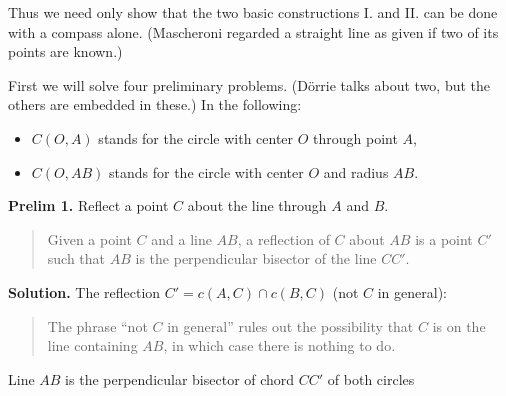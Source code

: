 \documentclass[11pt,a4paper]{article}
\begin{document}
Thus we need only show that the two basic constructions I. and II. can be done with a compass alone. (Mascheroni regarded a straight line as given if two of its points are known.)

First we will solve four preliminary problems. (Dörrie talks about two, but the others are embedded in these.) In the following:
\begin{itemize}
\item $C(O,A)$ stands for the circle with center $O$ through point $A$,
\item $C(O,AB)$ stands for the circle with center $O$ and radius $AB$.
\end{itemize}


\pagebreak[3]

\textbf{Prelim 1.} Reflect a point $C$ about the line through $A$ and $B$.

\begin{quote}
Given a point $C$ and a line $AB$, a reflection of $C$ about $AB$ is a point $C'$ such that $AB$ is the perpendicular bisector of the line $CC'$.
\end{quote}

\textbf{Solution.} The reflection $C'=c(A,C) \cap c(B,C)$ (not $C$ in general):

\begin{quote}
The phrase ``not $C$ in general'' rules out the possibility that $C$ is on the line containing $AB$, in which case there is nothing to do.
\end{quote}

\begin{center}

Line $AB$ is the perpendicular bisector of chord $CC'$ of both circles
\end{center}
\end{document}
